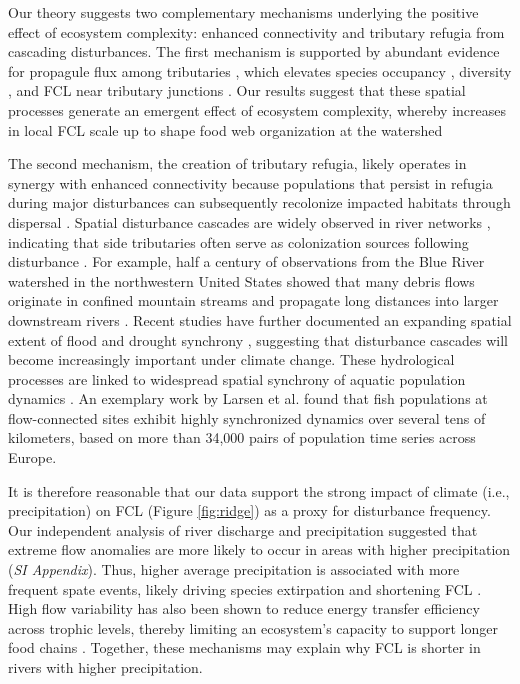 \documentclass[11pt, class=article, crop=false]{standalone}
\theoremstyle{definition}
\begin{document}
Our theory suggests two complementary mechanisms underlying the positive effect of ecosystem complexity: enhanced connectivity and tributary refugia from cascading disturbances.
The first mechanism is supported by abundant evidence for propagule flux among tributaries \citep{grant_living_2007, grant_use_2010, terui_dispersal_2014, uno_mainstemtributary_2015, tsuboi_small_2022, uno_bridging_2026}, which elevates species occupancy \citep{terui_asymmetric_2014, wahl_approximation_2024}, diversity \citep{uno_bridging_2026}, and FCL near tributary junctions \citep{sullivan_ecosystem_2015, sabo_pulsed_2018}.
Our results suggest that these spatial processes generate an emergent effect of ecosystem complexity, whereby increases in local FCL scale up to shape food web organization at the watershed 

The second mechanism, the creation of tributary refugia, likely operates in synergy with enhanced connectivity because populations that persist in refugia during major disturbances can subsequently recolonize impacted habitats through dispersal \citep{pomeranz_ecosystem_2023, koizumi_fishermen_2013}.
Spatial disturbance cascades are widely observed in river networks \citep{stanley_ecosystem_1997, swanson_flood_1998, nakamura_disturbance_2000, gomi_understanding_2002, messager_global_2021}, indicating that side tributaries often serve as colonization sources following disturbance \citep{koizumi_fishermen_2013}. 
For example, half a century of observations from the Blue River watershed in the northwestern United States showed that many debris flows originate in confined mountain streams and propagate long distances into larger downstream rivers \citep{nakamura_disturbance_2000}.
Recent studies have further documented an expanding spatial extent of flood and drought synchrony \citep{berghuijs_growing_2019, sharma_spatial_2024}, suggesting that disturbance cascades will become increasingly important under climate change. 
These hydrological processes are linked to widespread spatial synchrony of aquatic population dynamics \citep{sarremejane_drought_2021, larsen_geography_2021, tamario_barriers_2025}. 
An exemplary work by Larsen et al. \citep{larsen_geography_2021} found that fish populations at flow-connected sites exhibit highly synchronized dynamics over several tens of kilometers, based on more than 34,000 pairs of population time series across Europe.

It is therefore reasonable that our data support the strong impact of climate (i.e., precipitation) on FCL (Figure \ref{fig:ridge}) as a proxy for disturbance frequency.
Our independent analysis of river discharge and precipitation suggested that extreme flow anomalies are more likely to occur in areas with higher precipitation (\textit{SI Appendix}).
Thus, higher average precipitation is associated with more frequent spate events, likely driving species extirpation and shortening FCL \citep{sabo_food_2009, sabo_role_2010}. 
High flow variability has also been shown to reduce energy transfer efficiency across trophic levels, thereby limiting an ecosystem's capacity to support longer food chains \citep{baruch_food_2023}. 
Together, these mechanisms may explain why FCL is shorter in rivers with higher precipitation.
\end{document}
